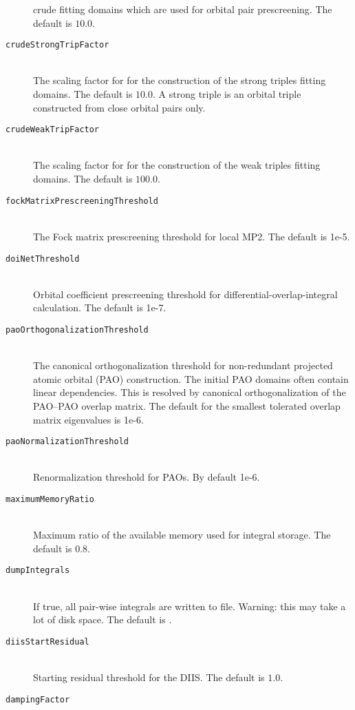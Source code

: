 \begin{description}
    crude fitting domains which are used for orbital pair prescreening. The default is $10.0$.
    \item [\texttt{crudeStrongTripFactor}]\hfill \\
    The scaling factor for  for the construction of the strong triples
    fitting domains. The default is $10.0$. A strong triple is an orbital triple constructed from
    close orbital pairs only.
    \item [\texttt{crudeWeakTripFactor}]\hfill \\
    The scaling factor for  for the construction of the weak triples
    fitting domains. The default is $100.0$.
    \item [\texttt{fockMatrixPrescreeningThreshold}]\hfill \\
    The Fock matrix prescreening threshold for local MP2. The default is 1e-5.
    \item [\texttt{doiNetThreshold}]\hfill \\
    Orbital coefficient prescreening threshold for differential-overlap-integral calculation. The default
    is 1e-7.
    \item [\texttt{paoOrthogonalizationThreshold}]\hfill \\
    The canonical orthogonalization threshold for non-redundant projected atomic orbital (PAO) construction.
    The initial PAO domains often contain linear dependencies. This is resolved by canonical orthogonalization of
    the PAO--PAO overlap matrix. The default for the smallest tolerated overlap matrix eigenvalues is
    1e-6.
    \item [\texttt{paoNormalizationThreshold}]\hfill \\
    Renormalization threshold for PAOs. By default 1e-6.
    \item [\texttt{maximumMemoryRatio}]\hfill \\
    Maximum ratio of the available memory used for integral storage. The default is $0.8$.
    \item [\texttt{dumpIntegrals}]\hfill \\
    If true, all pair-wise integrals are written to file. Warning: this may take a lot of disk space.
    The default is .
    \item [\texttt{diisStartResidual}]\hfill \\
    Starting residual threshold for the DIIS. The default is $1.0$.
    \item [\texttt{dampingFactor}]\hfill \\

\end{description}
